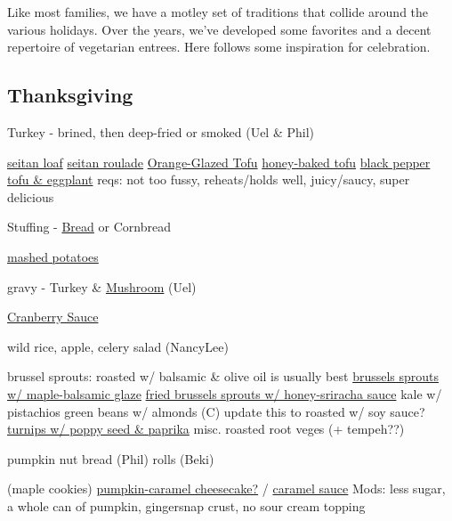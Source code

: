 Like most families, we have a motley set of traditions that collide around the various holidays. Over the years, we've developed some favorites and a decent repertoire of vegetarian entrees. Here follows some inspiration for celebration.

\subsection{Thanksgiving}

Turkey - brined, then deep-fried or smoked (Uel \& Phil)

\href{http://www.theppk.com/2011/11/seitan-roast-stuffed-with-shiitakes-and-leeks/}{seitan loaf}
\href{https://olivesfordinner.com/2011/11/seitan-roulade-with-sage-and-swee.html}{seitan roulade}
\hyperref[Orange-Glazed Tofu]{Orange-Glazed Tofu}
\href{https://www.theppk.com/2016/12/sweet-smoky-glazed-tofu-ham/}{honey-baked tofu}
\href{https://smittenkitchen.com/2019/08/black-pepper-tofu-and-eggplant/}{black pepper tofu \& eggplant}
reqs: not too fussy, reheats/holds well, juicy/saucy, super delicious

Stuffing - \hyperref[Bread Stuffing]{Bread} or Cornbread

\href{https://www.foodnetwork.com/recipes/alton-brown/creamy-mashed-potatoes-recipe-1956220}{mashed potatoes}

gravy - Turkey \& \href{https://www.kitchentreaty.com/vegetarian-onion-gravy/}{Mushroom} (Uel)

\hyperref[Cranberry Sauce]{Cranberry Sauce}

wild rice, apple, celery salad (NancyLee)

brussel sprouts: roasted w/ balsamic \& olive oil is usually best
\href{http://www.seriouseats.com/recipes/2012/11/roasted-brussels-sprouts-bacon-pecans-maple-balsamic-recipe.html}{brussels sprouts w/ maple-balsamic glaze}
\href{https://thepioneerwoman.com/food-and-friends/crispy-fried-brussels-sprouts/}{fried brussels sprouts w/ honey-sriracha sauce}
kale w/ pistachios
green beans w/ almonds (C)
update this to roasted w/ soy sauce?
\href{http://www.foodnetwork.com/recipes/mario-batali/roasted-turnips-recipe.html}{turnips w/ poppy seed \& paprika}
misc. roasted root veges (+ tempeh??)

pumpkin nut bread (Phil)
rolls (Beki)

(maple cookies)
\href{http://smittenkitchen.com/blog/2006/11/candy-corn-for-really-lucky-grown-ups/}{pumpkin-caramel cheesecake?} / \href{http://smittenkitchen.com/blog/2008/10/paris-a-deep-dark-salted-butter-caramel-sauce/}{caramel sauce}
Mods: less sugar, a whole can of pumpkin, gingersnap crust, no sour cream topping

